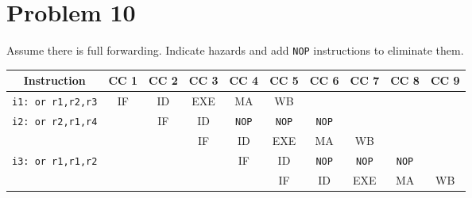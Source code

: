 \documentclass[10pt,letterpaper]{article}
\begin{document}

\section{Problem 10}
Assume there is full forwarding. Indicate hazards and add \texttt{NOP}  instructions to eliminate them.
\begin{center}\begin{tabular} { |c|c|c|c|c|c|c|c|c|c| }
\hline
Instruction & CC 1 & CC 2 & CC 3 & CC 4 & CC 5 & CC 6 & CC 7 & CC 8 & CC 9\\
\hline
\texttt{i1: or r1,r2,r3} & IF & ID & EXE & MA & WB & & & & \\
\hline
\texttt{i2: or r2,r1,r4} & & IF & ID & \texttt{NOP} & \texttt{NOP} & \texttt{NOP} & & & \\
\hline
& & & IF & ID & EXE & MA & WB & & \\
\hline
\texttt{i3: or r1,r1,r2} & & & & IF & ID & \texttt{NOP} & \texttt{NOP} & \texttt{NOP} & \\
\hline
& & & & & IF & ID & EXE & MA & WB \\
\hline
\end{tabular}\end{center}
\pagebreak

\end{document}
